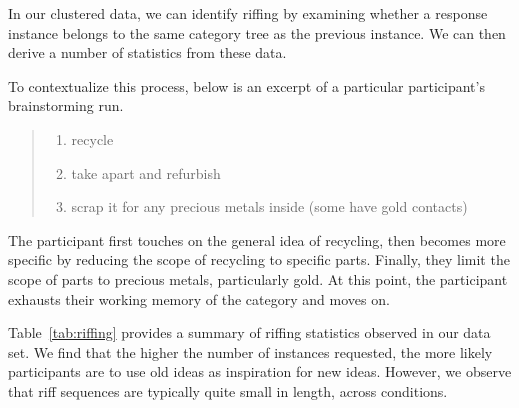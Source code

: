 In our clustered data, we can identify riffing by examining whether a response instance belongs to the same category tree as the previous instance. We can then derive a number of statistics from these data.

To contextualize this process, below is an excerpt of a particular participant's brainstorming run.

\begin{quote}
    \begin{enumerate}
        \item recycle
        \item take apart and refurbish
        \item scrap it for any precious metals inside (some have gold contacts)
    \end{enumerate}
\end{quote}

The participant first touches on the general idea of recycling, then becomes more specific by reducing the scope of recycling to specific parts. Finally, they limit the scope of parts to precious metals, particularly gold. At this point, the participant exhausts their working memory of the category and moves on.

Table~\ref{tab:riffing} provides a summary of riffing statistics observed in our data set. We find that the higher the number of instances requested, the more likely participants are to use old ideas as inspiration for new ideas. However, we observe that riff sequences are typically quite small in length, across conditions.




